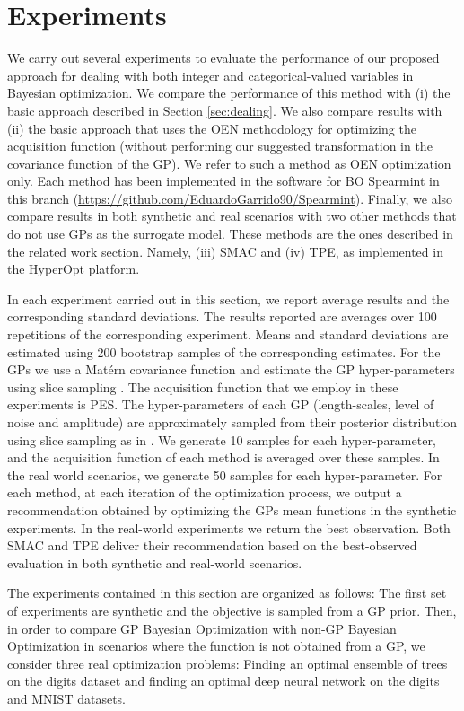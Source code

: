 \section{Experiments} \label{sec:experiments}

We carry out several experiments to evaluate the performance of our proposed approach for dealing with 
both integer and categorical-valued variables in Bayesian optimization. We compare the performance of this 
method with (i) the basic approach described in Section \ref{sec:dealing}. We also compare results with (ii) the 
basic approach that uses the OEN methodology for optimizing the acquisition function (without performing our 
suggested transformation in the covariance function of the GP). We refer to such a method as OEN optimization only. 
Each method has been implemented in the software for BO Spearmint in this branch (\url{https://github.com/EduardoGarrido90/Spearmint}).
Finally, we also compare results in both synthetic and real scenarios with two other methods that do not 
use GPs as the surrogate model. These methods are the ones described in the related work section. Namely, 
(iii) SMAC and (iv) TPE, as implemented in the HyperOpt platform.

In each experiment carried out in this section, we report average results and the corresponding
standard deviations. The results reported are averages over 100 repetitions of the corresponding experiment. 
Means and standard deviations are estimated using 200 bootstrap samples of the corresponding estimates. 
For the GPs we use a Mat\'ern covariance function and estimate 
the GP hyper-parameters using slice sampling \citep{murray2010}. The acquisition function that we employ in 
these experiments is PES.  The hyper-parameters of each GP
(length-scales, level of noise and amplitude) are approximately sampled from their posterior
distribution using slice sampling as in \cite{snoek2013}. We generate 10 samples for each
hyper-parameter, and the acquisition function of each method is averaged over these samples. In the real
world scenarios, we generate 50 samples for each hyper-parameter. For each method, at each iteration of the optimization 
process, we output a recommendation obtained by optimizing the GPs mean functions in the synthetic experiments. In the 
real-world experiments we return the best observation. Both SMAC and TPE deliver their recommendation
based on the best-observed evaluation in both synthetic and real-world scenarios.

The experiments contained in this section are organized as follows: The first set of experiments are synthetic and the
objective is sampled from a GP prior. Then, in order to compare GP Bayesian Optimization with non-GP Bayesian Optimization 
in scenarios where the function is not obtained from a GP, we consider three real optimization problems: Finding an optimal 
ensemble of trees on the digits dataset and finding an optimal deep neural network on the digits and MNIST datasets.

